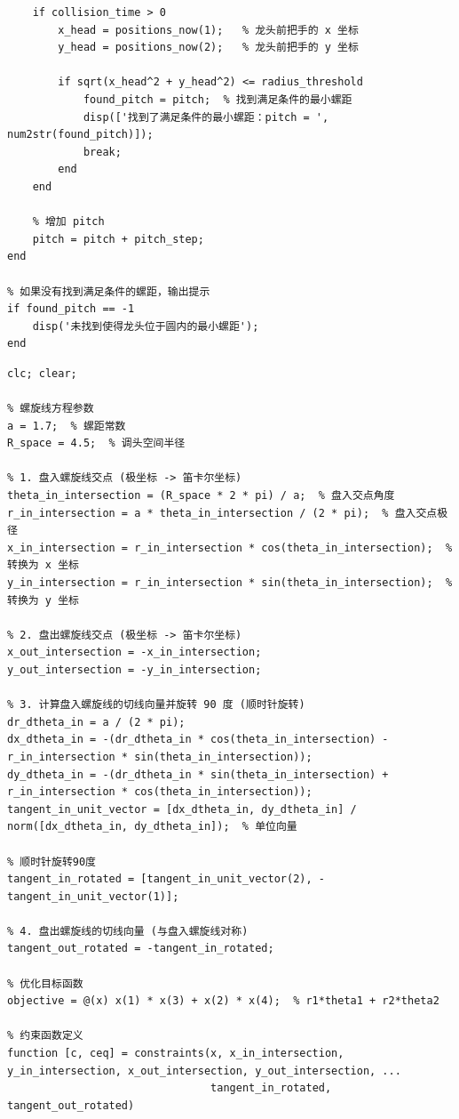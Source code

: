 \documentclass{cumcmthesis1}
\begin{document}
\begin{lstlisting}[caption={求解问题3的代码，将求解过程和结果打印到控制台}, label={lst:fourth_code}]
    % 如果发生碰撞，检查龙头是否位于目标圆内
    if collision_time > 0
        x_head = positions_now(1);   % 龙头前把手的 x 坐标
        y_head = positions_now(2);   % 龙头前把手的 y 坐标
        
        if sqrt(x_head^2 + y_head^2) <= radius_threshold
            found_pitch = pitch;  % 找到满足条件的最小螺距
            disp(['找到了满足条件的最小螺距：pitch = ', num2str(found_pitch)]);
            break;
        end
    end
    
    % 增加 pitch
    pitch = pitch + pitch_step;
end

% 如果没有找到满足条件的螺距，输出提示
if found_pitch == -1
    disp('未找到使得龙头位于圆内的最小螺距');
end

\end{lstlisting}

\begin{lstlisting}[caption={求解问题4中最短调头曲线的代码}, label={lst:fifth_code}]
clc; clear;

% 螺旋线方程参数
a = 1.7;  % 螺距常数
R_space = 4.5;  % 调头空间半径

% 1. 盘入螺旋线交点 (极坐标 -> 笛卡尔坐标)
theta_in_intersection = (R_space * 2 * pi) / a;  % 盘入交点角度
r_in_intersection = a * theta_in_intersection / (2 * pi);  % 盘入交点极径
x_in_intersection = r_in_intersection * cos(theta_in_intersection);  % 转换为 x 坐标
y_in_intersection = r_in_intersection * sin(theta_in_intersection);  % 转换为 y 坐标

% 2. 盘出螺旋线交点 (极坐标 -> 笛卡尔坐标)
x_out_intersection = -x_in_intersection;
y_out_intersection = -y_in_intersection;

% 3. 计算盘入螺旋线的切线向量并旋转 90 度 (顺时针旋转)
dr_dtheta_in = a / (2 * pi);
dx_dtheta_in = -(dr_dtheta_in * cos(theta_in_intersection) - r_in_intersection * sin(theta_in_intersection));
dy_dtheta_in = -(dr_dtheta_in * sin(theta_in_intersection) + r_in_intersection * cos(theta_in_intersection));
tangent_in_unit_vector = [dx_dtheta_in, dy_dtheta_in] / norm([dx_dtheta_in, dy_dtheta_in]);  % 单位向量

% 顺时针旋转90度
tangent_in_rotated = [tangent_in_unit_vector(2), -tangent_in_unit_vector(1)];

% 4. 盘出螺旋线的切线向量 (与盘入螺旋线对称)
tangent_out_rotated = -tangent_in_rotated;

% 优化目标函数
objective = @(x) x(1) * x(3) + x(2) * x(4);  % r1*theta1 + r2*theta2

% 约束函数定义
function [c, ceq] = constraints(x, x_in_intersection, y_in_intersection, x_out_intersection, y_out_intersection, ...
                                tangent_in_rotated, tangent_out_rotated)


\end{lstlisting}
\end{document}
